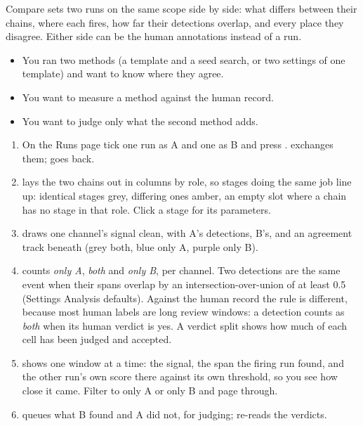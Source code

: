 Compare sets two runs on the same scope side by side: what differs between their chains, where each
fires, how far their detections overlap, and every place they disagree. Either side can be the human
annotations instead of a run.

\begin{itemize}
  \item You ran two methods (a template and a seed search, or two settings of one template) and want
        to know where they agree.
  \item You want to measure a method against the human record.
  \item You want to judge only what the second method adds.
\end{itemize}


\begin{enumerate}
  \item On the Runs page tick one run as A and one as B and press . 
        exchanges them;  goes back.
  \item {} lays the two chains out in columns by role, so stages doing the same job
        line up: identical stages grey, differing ones amber, an empty slot where a chain has no
        stage in that role. Click a stage for its parameters.
  \item {} draws one channel's signal clean, with A's detections, B's, and an
        agreement track beneath (grey both, blue only A, purple only B).
  \item {} counts \emph{only A}, \emph{both} and \emph{only B}, per channel. Two
        detections are the same event when their spans overlap by an intersection-over-union of at
        least 0.5 (Settings \textrightarrow{} Analysis defaults). Against the human record the rule
        is different, because most human labels are long review windows: a detection counts as
        \emph{both} when its human verdict is yes. A verdict split shows how much of each cell has
        been judged and accepted.
  \item {} shows one window at a time: the signal, the span the
        firing run found, and the other run's own score there against its own threshold, so you see
        how close it came. Filter to only A or only B and page through.
  \item {} queues what B found and A did not, for judging;
         re-reads the verdicts.
\end{enumerate}

